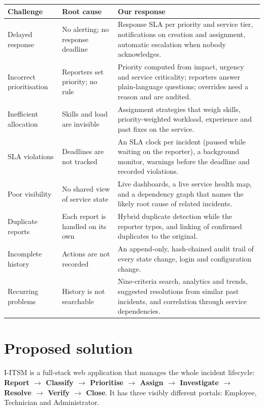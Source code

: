 \noindent\begin{tabularx}{\textwidth}{@{}>{\raggedright\arraybackslash}p{3cm}>{\raggedright\arraybackslash}p{4cm}>{\raggedright\arraybackslash}X@{}}
\toprule
\textbf{Challenge} & \textbf{Root cause} & \textbf{Our response} \\
\midrule
Delayed response & No alerting; no response deadline & Response SLA per priority and
  service tier, notifications on creation and assignment, automatic escalation when nobody
  acknowledges. \\
Incorrect prioritisation & Reporters set priority; no rule & Priority computed from impact,
  urgency and service criticality; reporters answer plain-language questions; overrides
  need a reason and are audited. \\
Inefficient allocation & Skills and load are invisible & Assignment strategies that weigh
  skills, priority-weighted workload, experience and past fixes on the service. \\
SLA violations & Deadlines are not tracked & An SLA clock per incident (paused while waiting on
  the reporter), a background monitor, warnings before the deadline and recorded violations. \\
Poor visibility & No shared view of service state & Live dashboards, a live service health map, and
  a dependency graph that names the likely root cause of related incidents. \\
Duplicate reports & Each report is handled on its own & Hybrid duplicate detection while the
  reporter types, and linking of confirmed duplicates to the original. \\
Incomplete history & Actions are not recorded & An append-only, hash-chained audit trail of
  every state change, login and configuration change. \\
Recurring problems & History is not searchable & Nine-criteria search, analytics and trends,
  suggested resolutions from similar past incidents, and correlation through service
  dependencies. \\
\bottomrule
\end{tabularx}

\section{Proposed solution}

I-ITSM is a full-stack web application that manages the whole incident lifecycle:
\textbf{Report $\rightarrow$ Classify $\rightarrow$ Prioritise $\rightarrow$ Assign
$\rightarrow$ Investigate $\rightarrow$ Resolve $\rightarrow$ Verify $\rightarrow$ Close}.
It has three visibly different portals: Employee, Technician and Administrator.


